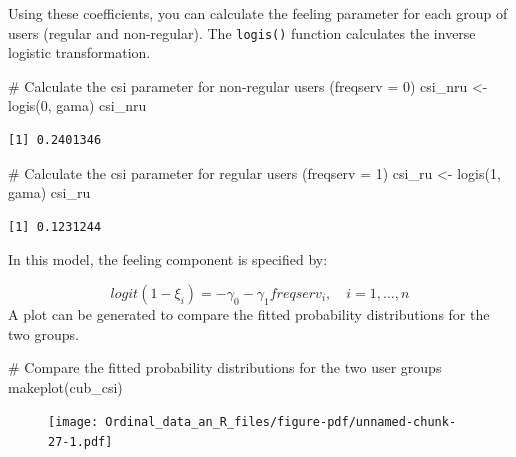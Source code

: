 \documentclass[
  letterpaper,
  DIV=11,
  numbers=noendperiod]{scrartcl}
\newenvironment{Shaded}{\begin{snugshade}}{\end{snugshade}}
\newcommand{\CommentTok}[1]{\textcolor[rgb]{0.37,0.37,0.37}{#1}}
\newcommand{\DecValTok}[1]{\textcolor[rgb]{0.68,0.00,0.00}{#1}}
\newcommand{\FunctionTok}[1]{\textcolor[rgb]{0.28,0.35,0.67}{#1}}
\newcommand{\NormalTok}[1]{\textcolor[rgb]{0.00,0.23,0.31}{#1}}
\newcommand{\OtherTok}[1]{\textcolor[rgb]{0.00,0.23,0.31}{#1}}
\begin{document}
Using these coefficients, you can calculate the feeling parameter for
each group of users (regular and non-regular). The \texttt{logis()}
function calculates the inverse logistic transformation.

\begin{Shaded}
\begin{Highlighting}[]
\CommentTok{\# Calculate the csi parameter for non{-}regular users (freqserv = 0)}
\NormalTok{csi\_nru }\OtherTok{\textless{}{-}} \FunctionTok{logis}\NormalTok{(}\DecValTok{0}\NormalTok{, gama)}
\NormalTok{csi\_nru}
\end{Highlighting}
\end{Shaded}

\begin{verbatim}
[1] 0.2401346
\end{verbatim}

\begin{Shaded}
\begin{Highlighting}[]
\CommentTok{\# Calculate the csi parameter for regular users (freqserv = 1)}
\NormalTok{csi\_ru }\OtherTok{\textless{}{-}} \FunctionTok{logis}\NormalTok{(}\DecValTok{1}\NormalTok{, gama)}
\NormalTok{csi\_ru}
\end{Highlighting}
\end{Shaded}

\begin{verbatim}
[1] 0.1231244
\end{verbatim}

In this model, the feeling component is specified by:

\[
logit(1-\xi_i) = - \gamma_0 - \gamma_1 freqserv_i, \quad i = 1,\dots,n
\] A plot can be generated to compare the fitted probability
distributions for the two groups.

\begin{Shaded}
\begin{Highlighting}[]
\CommentTok{\# Compare the fitted probability distributions for the two user groups}
\FunctionTok{makeplot}\NormalTok{(cub\_csi)}
\end{Highlighting}
\end{Shaded}

\begin{figure}[H]

{\centering \texttt{[image: Ordinal\_data\_an\_R\_files/figure-pdf/unnamed-chunk-27-1.pdf]}

}

\end{figure}
\end{document}

